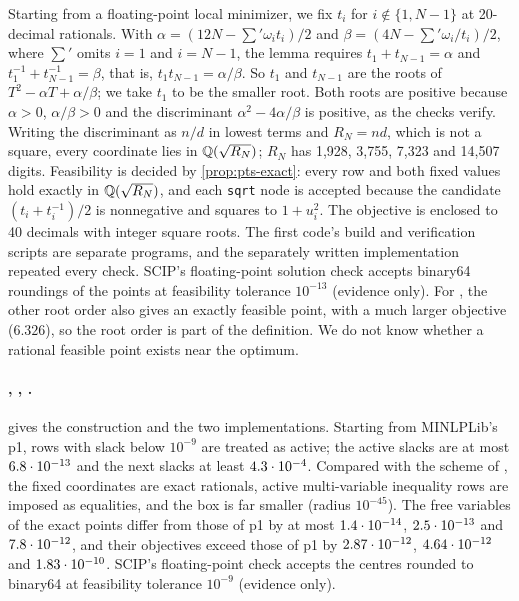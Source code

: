 Starting from a floating-point local minimizer, we fix $t_i$ for $i\notin\{1,N-1\}$ at 20-decimal rationals.
With $\alpha=(12N-\sum'\omega_it_i)/2$ and $\beta=(4N-\sum'\omega_i/t_i)/2$, where $\sum'$ omits $i=1$ and $i=N-1$, the lemma requires $t_1+t_{N-1}=\alpha$ and $t_1^{-1}+t_{N-1}^{-1}=\beta$, that is, $t_1t_{N-1}=\alpha/\beta$.
So $t_1$ and $t_{N-1}$ are the roots of $T^2-\alpha T+\alpha/\beta$; we take $t_1$ to be the smaller root.
Both roots are positive because $\alpha>0$, $\alpha/\beta>0$ and the discriminant $\alpha^2-4\alpha/\beta$ is positive, as the checks verify.
Writing the discriminant as $n/d$ in lowest terms and $R_N=nd$, which is not a square, every coordinate lies in $\mathbb{Q}(\sqrt{R_N})$; $R_N$ has 1,928, 3,755, 7,323 and 14,507 digits.
Feasibility is decided by \cref{prop:pts-exact}: every row and both fixed values hold exactly in $\mathbb{Q}(\sqrt{R_N})$, and each \texttt{sqrt} node is accepted because the candidate $(t_i+t_i^{-1})/2$ is nonnegative and squares to $1+u_i^2$.
The objective is enclosed to 40 decimals with integer square roots.
The first code's build and verification scripts are separate programs, and the separately written implementation repeated every check.
SCIP's floating-point solution check accepts binary64 roundings of the points at feasibility tolerance $10^{-13}$ (evidence only).
For , the other root order also gives an exactly feasible point, with a much larger objective ($6.326$), so the root order is part of the definition.
We do not know whether a rational feasible point exists near the optimum.

\paragraph{, , .}
 gives the construction and the two implementations.
Starting from MINLPLib's p1, rows with slack below $10^{-9}$ are treated as active; the active slacks are at most $6.8\cdot 10^{-13}$ and the next slacks at least $4.3\cdot 10^{-4}$.
Compared with the scheme of \citet{kearfott1998-on-proving-existence-of-feasible}, the fixed coordinates are exact rationals, active multi-variable inequality rows are imposed as equalities, and the box is far smaller (radius $10^{-45}$).
The free variables of the exact points differ from those of p1 by at most $1.4\cdot 10^{-14}$, $2.5\cdot 10^{-13}$ and $7.8\cdot 10^{-12}$, and their objectives exceed those of p1 by $2.87\cdot 10^{-12}$, $4.64\cdot 10^{-12}$ and $1.83\cdot 10^{-10}$.
SCIP's floating-point check accepts the centres rounded to binary64 at feasibility tolerance $10^{-9}$ (evidence only).

